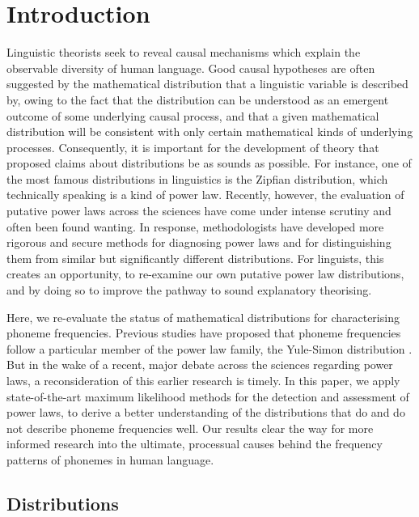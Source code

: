 

\section{Introduction}
\label{Sec:intro}	%


Linguistic theorists seek to reveal causal mechanisms which explain the observable diversity of human language. Good causal hypotheses are often suggested by the mathematical distribution that a linguistic variable is described by, owing to the fact that the distribution can be understood as an emergent outcome of some underlying causal process, and that a given mathematical distribution will be consistent with only certain mathematical kinds of underlying processes. Consequently, it is important for the development of theory that proposed claims about distributions be as sounds as possible. For instance, one of the most famous distributions in linguistics is the Zipfian distribution, which technically speaking is a kind of power law. Recently, however, the evaluation of putative power laws across the sciences have come under intense scrutiny and often been found wanting. In response, methodologists have developed more rigorous and secure methods for diagnosing power laws and for distinguishing them from similar but significantly different distributions. For linguists, this creates an opportunity, to re-examine our own putative power law distributions, and by doing so to improve the pathway to sound explanatory theorising.

Here, we re-evaluate the status of mathematical distributions for characterising phoneme frequencies. Previous studies have proposed that phoneme frequencies follow a particular member of the power law family, the Yule-Simon distribution \autocites{martindale_comparison_1996}{tambovtsev_phoneme_2007}. But in the wake of a recent, major debate across the sciences regarding power laws, a reconsideration of this earlier research is timely. In this paper, we apply state-of-the-art maximum likelihood methods for the detection and assessment of power laws, to derive a better understanding of the distributions that do and do not describe phoneme frequencies well. Our results clear the way for more informed research into the ultimate, processual causes behind the frequency patterns of phonemes in human language.

\hypertarget{distributions}{%
\subsection{Distributions}\label{distributions}}

